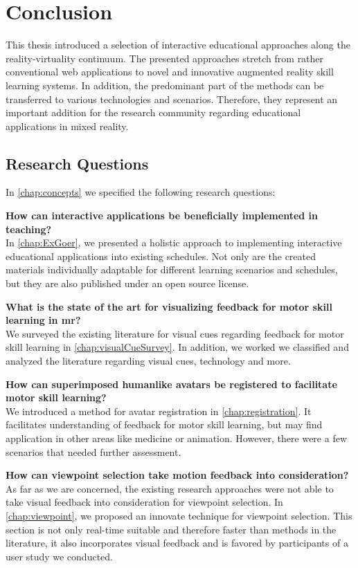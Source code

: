 %
\chapter{Conclusion}
\label{chap:conclusion}

This thesis introduced a selection of interactive educational approaches along the reality-virtuality continuum.
The presented approaches stretch from rather conventional web applications to novel and innovative augmented reality skill learning systems. In addition, the predominant part of the methods can be transferred to various technologies and scenarios. Therefore, they represent an important addition for the research community regarding educational applications in mixed reality. 

\section{Research Questions \label{sec:questions}}
In \autoref{chap:concepts} we specified the following research questions:

\textbf{How can interactive applications be beneficially implemented in teaching?}\\
In \autoref{chap:ExGoer}, we presented a holistic approach to implementing interactive educational applications into existing schedules.
Not only are the created materials individually adaptable for different learning scenarios and schedules, but they are also published under an open source license.

\textbf{What is the state of the art for visualizing feedback for motor skill learning in \acrlong{mr}?}\\
We surveyed the existing literature for visual cues regarding feedback for motor skill learning in \autoref{chap:visualCueSurvey}. In addition, we worked we classified and analyzed the literature regarding visual cues, technology and more.

\textbf{How can superimposed humanlike avatars be registered to facilitate motor skill learning?}\\
We introduced a method for avatar registration in \autoref{chap:registration}. It facilitates understanding of feedback for motor skill learning, but may find application in other areas like medicine or animation. However, there were a few scenarios that needed further assessment.

\textbf{How can viewpoint selection take motion feedback into consideration?}\\
As far as we are concerned, the existing research approaches were not able to take visual feedback into consideration for viewpoint selection. In \autoref{chap:viewpoint}, we proposed an innovate technique for viewpoint selection. This section is not only real-time suitable and therefore faster than methods in the literature, it also incorporates visual feedback and is favored by participants of a user study we conducted.

